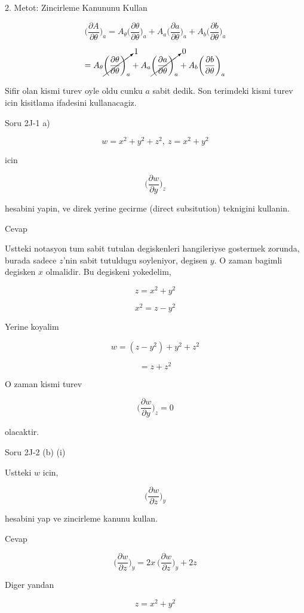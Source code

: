 \documentclass[12pt,fleqn]{article}
\begin{document}
2. Metot: Zincirleme Kanununu Kullan

\[ \bigg( \frac{\partial A}{\partial \theta} \bigg)_{a} = 
A_\theta \bigg( \frac{\partial \theta}{\partial \theta} \bigg)_{a} + 
A_a \bigg( \frac{\partial a}{\partial \theta} \bigg)_{a} + 
A_b \bigg( \frac{\partial b}{\partial \theta} \bigg)_{a} 
 \]

\[  = 
A_\theta \cancelto{1}{\bigg( \frac{\partial \theta}{\partial \theta} \bigg)_{a}} + 
A_a \cancelto{0}{\bigg( \frac{\partial a}{\partial \theta} \bigg)_{a}} + 
A_b \bigg( \frac{\partial b}{\partial \theta} \bigg)_{a}
 \]

Sifir olan kismi turev oyle oldu cunku $a$ sabit dedik. Son terimdeki
kismi turev icin kisitlama ifadesini kullanacagiz.

Soru 2J-1 a)

\[ w = x^2+y^2+z^2, \ z = x^2+y^2 \]

icin 

\[ \bigg( \frac{\partial w}{\partial y}  \bigg)_z \]

hesabini yapin, ve direk yerine gecirme (direct subsitution) teknigini
kullanin. 

Cevap 

Ustteki notasyon tum sabit tutulan degiskenleri hangileriyse gostermek
zorunda, burada sadece $z$'nin sabit tutuldugu soyleniyor, degisen $y$. O
zaman bagimli degisken $x$ olmalidir. Bu degiskeni yokedelim,

\[ z = x^2+y^2 \]

\[ x^2 = z - y^2 \]

Yerine koyalim

\[  w = (z-y^2)+y^2+z^2 \]

\[ = z + z^2 \]

O zaman kismi turev

\[ \bigg( \frac{\partial w}{\partial y}  \bigg)_z  = 0\]

olacaktir. 

Soru 2J-2 (b) (i)

Ustteki $w$ icin, 

\[ \bigg( \frac{\partial w}{\partial z}  \bigg)_y \]

hesabini yap ve zincirleme kanunu kullan. 

Cevap 

\[  \bigg( \frac{\partial w}{\partial z}  \bigg)_y  =
2x \  \bigg( \frac{\partial w}{\partial z}  \bigg)_y  +  2z
 \]

Diger yandan 

\[ z = x^2 + y^2 \]
\end{document}
